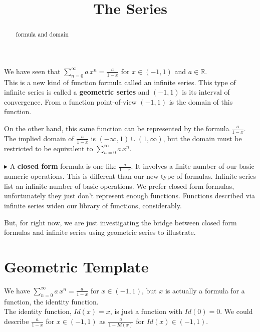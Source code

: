 \documentclass{ximera}
\title{The Series}
\begin{document}
\begin{abstract}
formula and domain
\end{abstract}
\maketitle




We have seen that $\sum\limits_{n=0}^{\infty} a \, x^n = \frac{a}{1-x}$ for $x \in (-1, 1)$ and $a \in \mathbb{R}$. \\




This is a new kind of function formula called an infinite series.  This type of infinite series is called a \textbf{geometric series} and $(-1, 1)$ is its interval of convergence.  From a function point-of-view $(-1, 1)$  is the domain of this function.


On the other hand, this same function can be represented by the formula $\frac{a}{1-x}$.  The implied domain of $\frac{a}{1-x}$ is $(-\infty, 1) \cup (1, \infty)$, but the domain must be restricted to be equivalent to $\sum\limits_{n=0}^{\infty} a \, x^n$.   




$\blacktriangleright$ A \textbf{closed form} formula is one like  $\frac{a}{1-x}$.  It involves a finite number of our basic numeric operations.  This is different than our new type of formulas.  Infinite series list an infinite number of basic operations.  We prefer closed form formulas, unfortunately they just don't represent enough functions. Functions described via infinite series widen our library of functions, considerably.

But, for right now, we are just investigating the bridge between closed form formulas and infinite series using geometric series to illustrate.






\section{Geometric Template}


We have $\sum\limits_{n=0}^{\infty} a \, x^n = \frac{a}{1-x}$ for $x \in (-1, 1)$, but $x$ is actually a formula for a function, the identity function. \\



The identity function, $Id(x) = x$, is just a function with $Id(0) = 0$.  We could describe $\frac{a}{1-x}$ for $x \in (-1, 1)$ as $\frac{a}{1-Id(x)}$ for $Id(x) \in (-1, 1)$.
\end{document}
